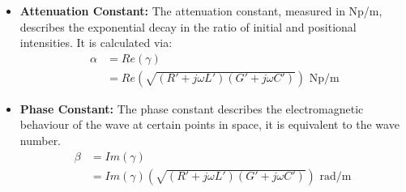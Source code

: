 \documentclass{book}
\begin{document}
\begin{itemize}
	\item \textbf{Attenuation Constant:} The attenuation constant, measured in Np/m, describes the exponential decay in the ratio of initial and positional intensities. It is calculated via:
	\begin{align*}
		\alpha &= Re(\gamma) \\
		&= Re(\sqrt{(R' + j\omega L')(G' + j\omega C') }) \text{ Np/m}
	\end{align*}
	\item \textbf{Phase Constant:} The phase constant describes the electromagnetic behaviour of the wave at certain points in space, it is equivalent to the wave number.
	\begin{align*}
		\beta &= Im(\gamma) \\
		&= Im(\gamma) (\sqrt{(R' + j\omega L')(G' + j\omega C')}) \text{ rad/m }
	\end{align*}
\end{itemize}
\end{document}
